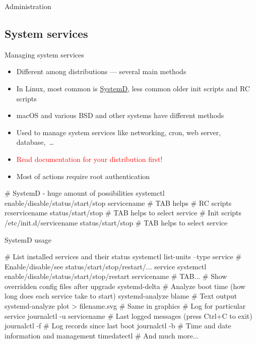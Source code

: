 \documentclass[compress, ucs, xelatex, 11pt, xcolor=svgnames,
  hyperref={
    bookmarks=true,
    unicode=true,
    colorlinks=true,
    pdftitle={Linux, command line and MetaCentrum},
    plainpages=false,
    pdfauthor={Vojtech Zeisek},
    pdfsubject={Course about use of Linux command line, writing shell scripts and using MetaCentrum of CESNET},
    pdfcreator={XeLaTeX},
    pdfkeywords={Linux, GNU, BASH, shell, command line, MetaCentrum},
    linkcolor=DarkRed,
    anchorcolor=DarkBlue,
    citecolor=Indigo,
    filecolor=NavyBlue,
    menucolor=DarkMagenta,
    urlcolor=DarkBlue,
    pdftex},
  url={hyphens, lowtilde} %
  ]{beamer}
\renewcommand{\alert}[1]{\textcolor{red}{#1}}
\begin{document}
\begin{frame}{Administration}
  \tableofcontents[currentsection, sectionstyle=show/hide, hideothersubsections]
\end{frame}


\subsection{System services}

\begin{frame}[fragile]{Managing system services}
  \begin{itemize}
    \item Different among distributions --- several main methods
    \item In Linux, most common is \href{https://wiki.freedesktop.org/www/Software/systemd/}{SystemD}, less common older init scripts and RC scripts
    \item macOS and various BSD and other systems have different methods
    \item Used to manage system services like networking, cron, web server, database,~\ldots
    \item \alert{Read documentation for your distribution first!}
    \item Most of actions require root authentication
  \end{itemize}
  \begin{bashcode}
    # SystemD - huge amount of possibilities
    systemctl enable/disable/status/start/stop servicename # TAB helps
    # RC scripts
    rcservicename status/start/stop # TAB helps to select service
    # Init scripts
    /etc/init.d/servicename status/start/stop # TAB helps to select service
  \end{bashcode}
\end{frame}

\begin{frame}[fragile]{SystemD usage}
  \begin{bashcode}
    # List installed services and their status
    systemctl list-units --type service
    # Enable/disable/see status/start/stop/restart/... service
    systemctl enable/disable/status/start/stop/restart servicename # TAB...
    # Show overridden config files after upgrade
    systemd-delta
    # Analyze boot time (how long does each service take to start)
    systemd-analyze blame # Text output
    systemd-analyze plot > filename.svg # Same in graphics
    # Log for particular service
    journalctl -u servicename
    # Last logged messages (press Ctrl+C to exit)
    journalctl -f
    # Log records since last boot
    journalctl -b
    # Time and date information and management
    timedatectl
    # And much more...
  \end{bashcode}
\end{frame}
\end{document}
